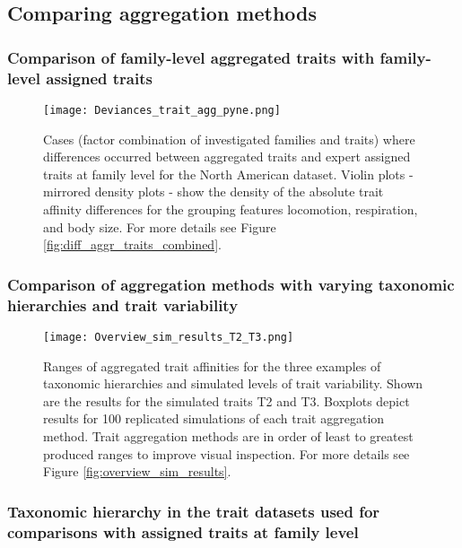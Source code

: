 \documentclass[../Draft_harmonization_paper.tex]{subfiles}
\begin{document}
\newpage

\subsection*{Comparing aggregation methods}

\subsubsection*{Comparison of family-level aggregated traits with family-level assigned traits}

\begin{figure}[H]
    \centering
    \texttt{[image: Deviances\_trait\_agg\_pyne.png]}
    \caption{Cases (factor combination of investigated families and traits) where differences occurred between aggregated traits and expert assigned traits at family level for the North American dataset. Violin plots - mirrored density plots - show the density of the absolute trait affinity differences for the grouping features locomotion, respiration, and body size. For more details see Figure \ref{fig:diff_aggr_traits_combined}.}
    \label{fig:diff_aggr_traits_pyne}
  \end{figure}


\subsubsection*{Comparison of aggregation methods with varying taxonomic hierarchies and trait variability}

\begin{figure}[H]
    \centering
    \texttt{[image: Overview\_sim\_results\_T2\_T3.png]}
    \caption{Ranges of aggregated trait affinities for the three examples of taxonomic hierarchies and simulated levels of trait variability. Shown are the results for the simulated traits T2 and T3. Boxplots depict results for 100 replicated simulations of each trait aggregation method. Trait aggregation methods are in order of least to greatest produced ranges to improve visual inspection. For more details see Figure \ref{fig:overview_sim_results}.}
    \label{fig:overview_sim_results_T2_T3}
  \end{figure}

\subsubsection*{Taxonomic hierarchy in the trait datasets used for comparisons with assigned traits at family level}
\label{sec:taxonomic_hierarchy}
\end{document}
